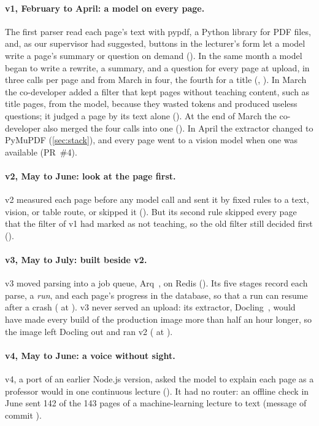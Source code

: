 \paragraph{v1, February to April: a model on every page.}
The first parser read each page's text with pypdf, a Python library for PDF
files, and, as our supervisor had suggested, buttons in the lecturer's form let
a model write a page's summary or question on demand (). In the
same month a model began to write a rewrite, a summary, and a question for
every page at upload, in three calls per page and from March in four, the
fourth for a title (, ). In March the co-developer added a filter that kept pages
without teaching content, such as title pages, from the model, because they
wasted tokens and produced useless questions; it judged a page by its text
alone (). At the end of March the co-developer also merged the
four calls into one (). In April
the extractor changed to PyMuPDF (\cref{sec:stack}), and every page went to a
vision model when one was available (PR~\#4).

\paragraph{v2, May to June: look at the page first.}
v2 measured each page before any model call and sent it by fixed rules to a
text, vision, or table route, or skipped it (). But its second
rule skipped every page that the filter of v1 had marked as not teaching, so
the old filter still decided first ().

\paragraph{v3, May to July: built beside v2.}
v3 moved parsing into a job queue, Arq~\cite{arq}, on Redis
(). Its five stages record each parse, a \emph{run}, and
each page's progress in the database, so that a run can resume after a crash
( at ). v3 never served an upload: its extractor,
Docling~\cite{auer2024docling}, would have made every build of the production
image more than half an hour longer, so the image left Docling out and ran v2
( at ).

\paragraph{v4, May to June: a voice without sight.}
v4, a port of an earlier Node.js version, asked the model to explain each page
as a professor would in one continuous lecture (). It had no
router: an offline check in June sent 142 of the 143 pages of a
machine-learning lecture to text (message of commit
).

